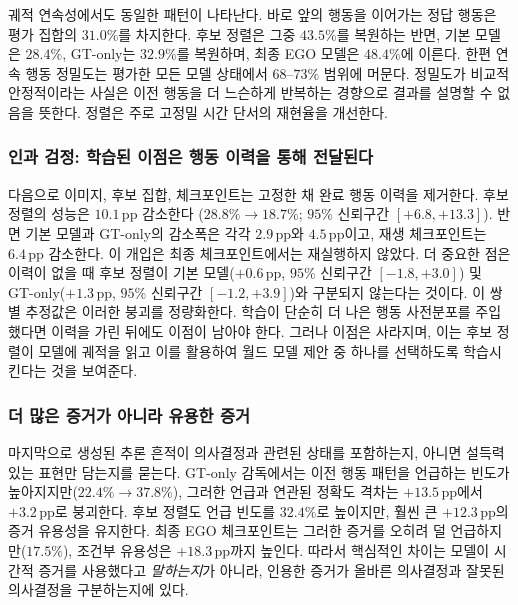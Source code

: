\documentclass[letterpaper]{article}
\newcommand{\obs}[1]{\textcolor{measuredblue}{#1}}
\newcommand{\pp}{\,\mathrm{pp}}
\newcommand{\method}{\textsc{EGO}}
\begin{document}
궤적 연속성에서도 동일한 패턴이 나타난다. 바로 앞의 행동을 이어가는 정답 행동은
평가 집합의 \obs{$31.0\%$}를 차지한다. 후보 정렬은 그중 \obs{$43.5\%$}를
복원하는 반면, 기본 모델은 \obs{$28.4\%$}, GT-only는 \obs{$32.9\%$}를
복원하며, 최종 \method{} 모델은 \obs{$48.4\%$}에 이른다.
한편 연속 행동 정밀도는 평가한 모든 모델 상태에서 \obs{$68$--$73\%$} 범위에
머문다. 정밀도가 비교적 안정적이라는 사실은 이전 행동을 더 느슨하게 반복하는
경향으로 결과를 설명할 수 없음을 뜻한다. 정렬은 주로 고정밀 시간 단서의
재현율을 개선한다.

\subsubsection{인과 검정: 학습된 이점은 행동 이력을 통해 전달된다}
\label{sec:er-history}

다음으로 이미지, 후보 집합, 체크포인트는 고정한 채 완료 행동 이력을 제거한다.
후보 정렬의 성능은 \obs{$10.1\pp$} 감소한다
(\obs{$28.8\%\!\rightarrow18.7\%$};
\obs{$95\%$ 신뢰구간 $[+6.8,+13.3]$}). 반면 기본 모델과 GT-only의 감소폭은
각각 \obs{$2.9\pp$}와 \obs{$4.5\pp$}이고, 재생 체크포인트는 \obs{$6.4\pp$}
감소한다. 이 개입은 최종 체크포인트에서는 재실행하지 않았다.
더 중요한 점은 이력이 없을 때
후보 정렬이 기본 모델(\obs{$+0.6\pp$}, \obs{$95\%$ 신뢰구간
$[-1.8,+3.0]$}) 및 GT-only(\obs{$+1.3\pp$}, \obs{$95\%$ 신뢰구간
$[-1.2,+3.9]$})와 구분되지 않는다는 것이다. 이 쌍별 추정값은 이러한 붕괴를
정량화한다. 학습이 단순히 더 나은 행동 사전분포를 주입했다면
이력을 가린 뒤에도 이점이 남아야 한다. 그러나 이점은 사라지며, 이는 후보 정렬이
모델에 궤적을 읽고 이를 활용하여 월드 모델 제안 중 하나를 선택하도록
학습시킨다는 것을 보여준다.

\subsubsection{더 많은 증거가 아니라 유용한 증거}
\label{sec:er-evidence}

마지막으로 생성된 추론 흔적이 의사결정과 관련된 상태를 포함하는지, 아니면
설득력 있는 표현만 담는지를 묻는다. GT-only 감독에서는 이전 행동 패턴을
언급하는 빈도가 높아지지만(\obs{$22.4\%\!\rightarrow37.8\%$}), 그러한 언급과
연관된 정확도 격차는 \obs{$+13.5\pp$}에서 \obs{$+3.2\pp$}로 붕괴한다.
후보 정렬도 언급 빈도를 \obs{$32.4\%$}로 높이지만, 훨씬 큰
\obs{$+12.3\pp$}의 증거 유용성을 유지한다. 최종 \method{} 체크포인트는
그러한 증거를 오히려 덜 언급하지만(\obs{$17.5\%$}), 조건부 유용성은
\obs{$+18.3\pp$}까지 높인다. 따라서 핵심적인 차이는 모델이
시간적 증거를 사용했다고 \emph{말하는지}가 아니라, 인용한 증거가 올바른
의사결정과 잘못된 의사결정을 구분하는지에 있다.
\end{document}
